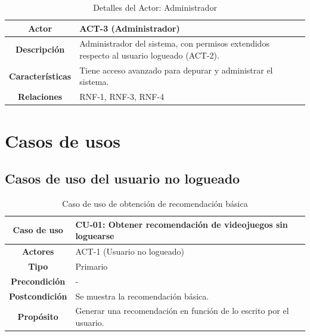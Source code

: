 \vspace{0.5cm}

\begin{table}[H]
\centering
\begin{tabular}{|c|p{10cm}|}
\hline
\rowcolor{green!40} \textbf{Actor} & ACT-3 (Administrador)\\ \hline
\rowcolor{blue!10} \textbf{Descripción} & Administrador del sistema, con permisos extendidos respecto al usuario logueado (ACT-2).\\ \hline
\rowcolor{blue!10} \textbf{Características} & Tiene acceso avanzado para depurar y administrar el sistema.\\ \hline
\rowcolor{blue!10} \textbf{Relaciones} & RNF-1, RNF-3, RNF-4\\ \hline
\end{tabular}
\caption{Detalles del Actor: Administrador}
\end{table}




\newpage
\section{Casos de usos}

\subsection{Casos de uso del usuario no logueado}

\begin{table}[H]
\centering
\begin{tabular}{|c|p{10cm}|}
\hline
\rowcolor{green!40} \textbf{Caso de uso} & CU-01: Obtener recomendación de videojuegos sin loguearse \\ \hline
\rowcolor{blue!10} \textbf{Actores} & ACT-1 (Usuario no logueado) \\ \hline
\rowcolor{blue!10} \textbf{Tipo} & Primario \\ \hline
\rowcolor{blue!10} \textbf{Precondición} & - \\ \hline
\rowcolor{blue!10} \textbf{Postcondición} & Se muestra la recomendación básica. \\ \hline
\rowcolor{blue!10} \textbf{Propósito} & Generar una recomendación en función de lo escrito por el usuario. \\ \hline
\end{tabular}
\caption{Caso de uso de obtención de recomendación básica}
\end{table}

